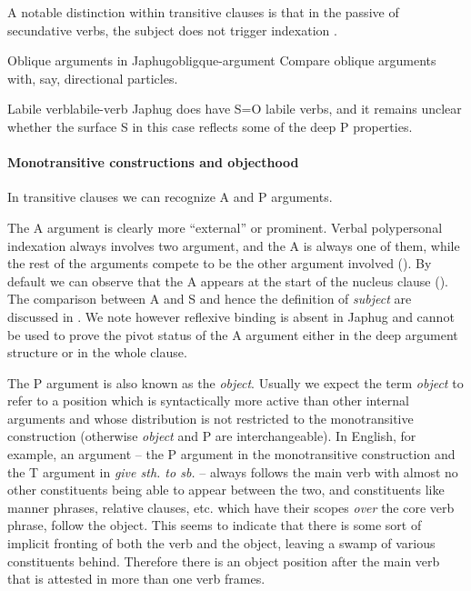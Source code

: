 \documentclass[a4paper, oneside, 12pt]{report}
\newcommand*{\citesec}[1]{\S~{#1}}
\newcommand*{\citepage}[1]{p.~{#1}}
\newcommand*{\term}[1]{\emph{#1}}
\newcommand{\form}[1]{\emph{#1}}
\begin{document}
A notable distinction within transitive clauses
is that in the passive of secundative verbs,
the subject does not trigger indexation
\citep[\citesec{18.1.4}]{jacques2021grammar}.

\begin{todobox}{Oblique arguments in Japhug}{obligque-argument}
    Compare oblique arguments with, say, directional particles.
\end{todobox}

\begin{todobox}{Labile verb}{labile-verb}
    Japhug does have S=O labile verbs,
    and it remains unclear whether the surface S in this case
    reflects some of the deep P properties. 
\end{todobox}

\paragraph*{Monotransitive constructions and objecthood}
\label{sec:grammatical.clause.internal.monotransitive}
In transitive clauses we can recognize A and P arguments.

The A argument is clearly more ``external'' or prominent.
Verbal polypersonal indexation always involves two argument,
and the A is always one of them, 
while the rest of the arguments compete to be the other argument involved 
().
By default we can observe that the A 
appears at the start of the nucleus clause 
().
The comparison between A and S and hence the definition of \term{subject}
are discussed in .
We note however reflexive binding is absent in Japhug
\citep[\citepage{543}]{jacques2021grammar}
and cannot be used to prove the pivot status of the A argument
either in the deep argument structure or in the whole clause.

The P argument is also known as the \term{object}.
Usually we expect the term \term{object} to refer to a position 
which is syntactically more active than other internal arguments
and whose distribution is not restricted to the monotransitive construction
(otherwise \term{object} and P are interchangeable).
In English, for example,
an argument -- the P argument in the monotransitive construction 
and the T argument in \form{give sth. to sb.} --
always follows the main verb with almost no other constituents
being able to appear between the two,
and constituents like manner phrases, relative clauses, etc.
which have their scopes \emph{over} the core verb phrase, follow the object.
This seems to indicate that there is some sort of implicit fronting 
of both the verb and the object,
leaving a swamp of various constituents behind.
Therefore there is an object position after the main verb
that is attested in more than one verb frames. 
\end{document}
